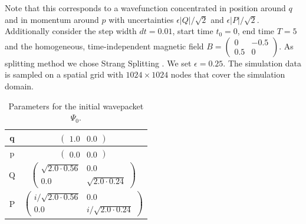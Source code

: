 \documentclass[11pt, a4paper, oneside]{article}
\begin{document}
 Note that this corresponds to a wavefunction concentrated in position around $q$ and in momentum around $p$ with uncertainties $\epsilon \lvert Q \rvert / \sqrt{2}$ and $\epsilon \lvert P \rvert / \sqrt{2}$. Additionally consider the step width $dt=0.01$, start time $t_0=0$, end time $T=5$ and the homogeneous, time-independent magnetic field $B = \begin{pmatrix} 0 & -0.5 \\ 0.5 & 0 \end{pmatrix}$. As splitting method we chose Strang Splitting . We set $\epsilon = 0.25$. The simulation data is sampled on a spatial grid with $1024 \times 1024$ nodes that cover the simulation domain.
\begin{table}[h]
  \centering
  \begin{tabular}{c|c}
    q & $\begin{pmatrix}1.0 & 0.0 \end{pmatrix}$ \\ \hline
    p & $\begin{pmatrix}0.0 & 0.0 \end{pmatrix}$ \\ \hline
    Q & $\begin{pmatrix}
      \sqrt{2.0 \cdot 0.56} & 0.0 \\
      0.0 & \sqrt{2.0 \cdot 0.24}
    \end{pmatrix}$ \\ \hline
    P & $\begin{pmatrix}
      i/\sqrt{2.0 \cdot 0.56} & 0.0 \\
      0.0 & i/\sqrt{2.0 \cdot 0.24}
    \end{pmatrix}$ \\
  \end{tabular}
  \caption{Parameters for the initial wavepacket $\Psi_0$.}
  \label{tab:params}

\end{table}
\end{document}

